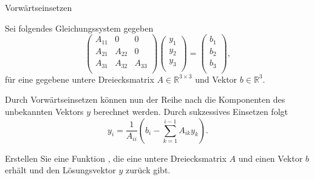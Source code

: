 \begin{exercise}{Vorw\"artseinsetzen}
\begin{body}
Sei folgendes Gleichungssystem gegeben
\[
\begin{pmatrix}
A_{11} & 0  &  0 \\
A_{21} & A_{22}  &  0 \\
A_{31} & A_{32}  &  A_{33} \\
\end{pmatrix}
\begin{pmatrix}
y_{1} \\
y_{2} \\
y_{3} \\
\end{pmatrix}
=
\begin{pmatrix}
b_{1} \\
b_{2} \\
b_{3} \\
\end{pmatrix}
,
\]
für eine gegebene untere Dreiecksmatrix $ A \in \mathbb{R}^{3\times 3} $ und Vektor $ b \in \mathbb{R}^3 $.
\medskip

Durch Vorw\"artseinsetzen k\"onnen nun der Reihe nach die Komponenten des unbekannten Vektors $y$ berechnet werden.
Durch sukzessives Einsetzen folgt
\[
y_i=\frac{1}{A_{ii}}\left(b_i-\sum_{k=1}^{i-1}A_{ik}y_k\right).
\]

\begin{parts}
\item Erstellen Sie eine Funktion , die eine untere Dreiecksmatrix $ A $ und einen Vektor $ b $ erh\"alt und den L\"osungsvektor $ y $ zur\"uck gibt.
\end{parts}
\end{body}

\begin{solution}
\begin{parts}
\end{parts}
\end{solution}
\end{exercise}
